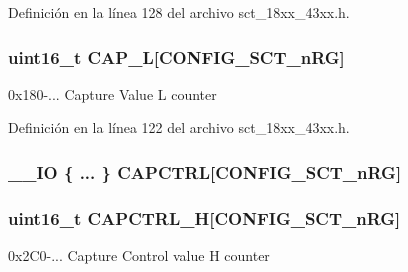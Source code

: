 Definición en la línea 128 del archivo sct\+\_\+18xx\+\_\+43xx.\+h.

\subsubsection[{\texorpdfstring{C\+A\+P\+\_\+L}{CAP_L}}]{ uint16\+\_\+t C\+A\+P\+\_\+L\mbox{[}{\bf C\+O\+N\+F\+I\+G\+\_\+\+S\+C\+T\+\_\+n\+RG}\mbox{]}}\hypertarget{struct_l_p_c___s_c_t___t_ac3c125811620bcdb8c1b0fe006042da5}{}\label{struct_l_p_c___s_c_t___t_ac3c125811620bcdb8c1b0fe006042da5}
0x180-\/... Capture Value L counter 

Definición en la línea 122 del archivo sct\+\_\+18xx\+\_\+43xx.\+h.

\subsubsection[{\texorpdfstring{C\+A\+P\+C\+T\+RL}{CAPCTRL}}]{\setlength{\rightskip}{0pt plus 5cm}\+\_\+\+\_\+\+IO \{ ... \}   C\+A\+P\+C\+T\+RL\mbox{[}{\bf C\+O\+N\+F\+I\+G\+\_\+\+S\+C\+T\+\_\+n\+RG}\mbox{]}}\hypertarget{struct_l_p_c___s_c_t___t_a4db84af44abde11a6e346edfd8ec781e}{}\label{struct_l_p_c___s_c_t___t_a4db84af44abde11a6e346edfd8ec781e}
\subsubsection[{\texorpdfstring{C\+A\+P\+C\+T\+R\+L\+\_\+H}{CAPCTRL_H}}]{ uint16\+\_\+t C\+A\+P\+C\+T\+R\+L\+\_\+H\mbox{[}{\bf C\+O\+N\+F\+I\+G\+\_\+\+S\+C\+T\+\_\+n\+RG}\mbox{]}}\hypertarget{struct_l_p_c___s_c_t___t_afa23aca429cb123a2703e765ffcb13f1}{}\label{struct_l_p_c___s_c_t___t_afa23aca429cb123a2703e765ffcb13f1}
0x2\+C0-\/... Capture Control value H counter 

